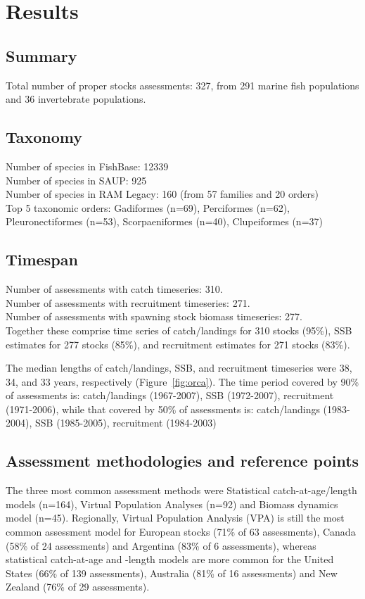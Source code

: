 \section*{Results}
\subsection*{Summary}
\noindent
Total number of proper stocks assessments: 327, from 291 marine fish populations and 36
invertebrate populations.

\subsection*{Taxonomy}
\noindent

Number of species in FishBase: 12339\\
Number of species in SAUP: 925\\
Number of species in RAM Legacy: 160 (from 57 families and 20 orders) \\
Top 5 taxonomic orders: Gadiformes (n=69), Perciformes (n=62), Pleuronectiformes (n=53), Scorpaeniformes (n=40), Clupeiformes (n=37) \\

\subsection*{Timespan}
\noindent
Number of assessments with catch timeseries: 310.\\
Number of assessments with recruitment timeseries: 271.\\
Number of assessments with spawning stock biomass timeseries: 277.\\

Together these comprise time series of
catch/landings for 310 stocks (95\%),
SSB estimates for 277 stocks (85\%), and recruitment estimates for
271 stocks (83\%).

The median lengths of catch/landings, SSB, and recruitment timeseries
were 38, 34, and 33
years, respectively (Figure~\ref{fig:orca}).  The time period covered by 90\% of assessments
is: catch/landings (1967-2007), SSB
(1972-2007), recruitment (1971-2006), while that
covered by 50\% of assessments is: catch/landings
(1983-2004), SSB (1985-2005), recruitment
(1984-2003)
 
\subsection*{Assessment methodologies and reference points}
\noindent
The three most common assessment methods were
Statistical catch-at-age/length models (n=164), Virtual Population Analyses (n=92) and
Biomass dynamics model (n=45). Regionally, Virtual Population Analysis
(VPA) is still the most common assessment model for European stocks
(71\% of 63 assessments),
Canada (58\% of 24
assessments) and Argentina (83\% of
6 assessments), whereas statistical catch-at-age
and -length models are more common for the United States
(66\% of 139 assessments),
Australia (81\% of 16
assessments) and New Zealand (76\% of
29 assessments).


